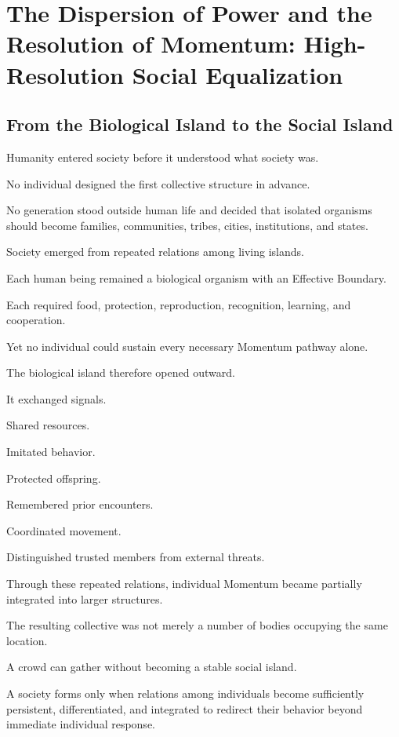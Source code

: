 

\section{The Dispersion of Power and the Resolution of Momentum: High-Resolution Social Equalization}

\subsection*{\textbf{From the Biological Island to the Social Island}}


Humanity entered society before it understood what society was.

No individual designed the first collective structure in advance.

No generation stood outside human life and decided that isolated organisms should become families, communities, tribes, cities, institutions, and states.

Society emerged from repeated relations among living islands.

Each human being remained a biological organism with an Effective Boundary.

Each required food, protection, reproduction, recognition, learning, and cooperation.

Yet no individual could sustain every necessary Momentum pathway alone.

The biological island therefore opened outward.

It exchanged signals.

Shared resources.

Imitated behavior.

Protected offspring.

Remembered prior encounters.

Coordinated movement.

Distinguished trusted members from external threats.

Through these repeated relations, individual Momentum became partially integrated into larger structures.

The resulting collective was not merely a number of bodies occupying the same location.

A crowd can gather without becoming a stable social island.

A society forms only when relations among individuals become sufficiently persistent, differentiated, and integrated to redirect their behavior beyond immediate individual response.

